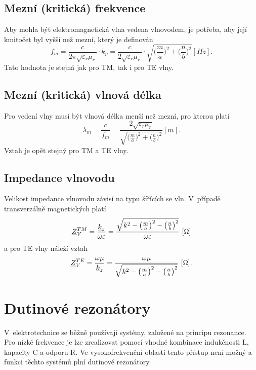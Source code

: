 \subsection*{Mezní (kritická) frekvence}
Aby mohla být elektromagnetická vlna vedena vlnovodem, je potřeba, aby její kmitočet byl vyšší než mezní, který je definován
\begin{equation}
f_{m} = \frac{c}{2\pi\sqrt{\varepsilon_{r}\mu_{r}}}\cdot k_p = \frac{c}{2\sqrt{\varepsilon_{r}\mu_{r}}}\cdot \sqrt{\bigg(\frac{m}{a}\bigg)^{2} + \bigg(\frac{n}{b}\bigg)^{2}}\unit{[Hz]}. 
	\label{rce:evlny_vlnovody_mezni_frekvence}
\end{equation}
Tato hodnota je stejná jak pro TM, tak i pro TE vlny.
\subsection*{Mezní (kritická) vlnová délka}
Pro vedení vlny musí být vlnová délka menší než mezní, pro kterou platí
\begin{equation}
\lambda_{m} = \frac{c}{f_{m}} = \frac{2\sqrt{\varepsilon_{r}\mu_{r}}}{\sqrt{\big(\frac{m}{a}\big)^{2} + \big(\frac{n}{b}\big)^{2}}}\unit{[m]}. 
	\label{rce:evlny_vlnovody_mezni_vlnova_delka}
\end{equation}
Vztah je opět stejný pro TM a TE vlny.
\subsection*{Impedance vlnovodu}
Velikost impedance vlnovodu závisí na typu šířících se vln. V~případě transverzálně magnetických platí
\begin{displaymath}
	{\underline{Z}}_{V}^{TM} = \frac{{\underline{k}}_z}{\omega\varepsilon} = \frac{\sqrt{k^{2} - \big(\frac{m}{a}\big)^{2} - \big(\frac{n}{b}\big)^{2}}}{\omega\varepsilon}\mathrm{\ [\Omega]}
\end{displaymath}
a pro TE vlny náleží vztah
\begin{displaymath}
	{\underline{Z}}_{V}^{TE} = \frac{\omega\mu}{{\underline{k}}_z} = \frac{\omega\mu}{\sqrt{k^{2} - \big(\frac{m}{a}\big)^{2} - \big(\frac{n}{b}\big)^{2}}}\mathrm{\ [\Omega]}.
\end{displaymath}

\section{Dutinové rezonátory}
V~elektrotechnice se běžně používají systémy, založené na principu rezonance. Pro nízké frekvence je lze zrealizovat pomocí vhodné kombinace indukčnosti L, kapacity C a odporu R. Ve vysokofrekvenční oblasti tento přístup není možný a funkci těchto systémů plní dutinové rezonátory. 

